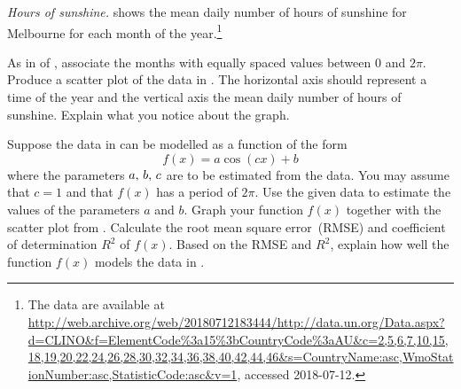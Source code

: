 \documentclass[a4paper,oneside,12pt]{article}
\begin{document}
\begin{problem}
{\begin{solution}
\end{solution}
}{}

\begin{table}[!htbp]
\centering

\caption{%
  The mean daily number of hours of sunshine for the city of
  Melbourne, Victoria, Australia.  The mean for each month was
  calculated using data for the years from $1961$ to $1990$.  The mean
  values are provided by the United Nations.
}
\label{tab:trigonometric:mean_daily_sunshine}
\end{table}

\item\emph{Hours of sunshine.}
   shows the mean
  daily number of hours of sunshine for Melbourne for each month of
  the year.\footnote{
    The data are available at
    \url{http://web.archive.org/web/20180712183444/http://data.un.org/Data.aspx?d=CLINO\&f=ElementCode\%3a15\%3bCountryCode\%3aAU\&c=2,5,6,7,10,15,18,19,20,22,24,26,28,30,32,34,36,38,40,42,44,46\&s=CountryName:asc,WmoStationNumber:asc,StatisticCode:asc\&v=1},
    accessed 2018-07-12.
  }
  \begin{packedenum}
  \item\label{subprob:trigonometric:mean_daily_sunshine_graph}
    As in  of
    , associate the
    months with equally spaced values between $0$ and $2\pi$.  Produce
    a scatter plot of the data in
    .  The horizontal
    axis should represent a time of the year and the vertical axis the
    mean daily number of hours of sunshine.  Explain what you notice
    about the graph.

  \item\label{subprob:trigonometric:mean_daily_sunshine_model}
    Suppose the data in 
    can be modelled as a function of the form
    \begin{equation}
    \label{eqn:trigonometric:mean_daily_sunshine_c1}
    f(x)
    =
    a \cos(cx) + b
    \end{equation}
    where the parameters ${a},\, {b},\, {c}$ are to be estimated from
    the data.  You may assume that $c = 1$ and that $f(x)$ has a
    period of $2\pi$.  Use the given data to estimate the values of
    the parameters $a$ and $b$.  Graph your function $f(x)$ together
    with the scatter plot
    from .
    Calculate the root mean square error~(RMSE) and coefficient of
    determination $R^2$ of $f(x)$.  Based on the RMSE and $R^2$,
    explain how well the function $f(x)$ models the data in
    .


\end{packedenum}
\end{problem}
\end{document}
